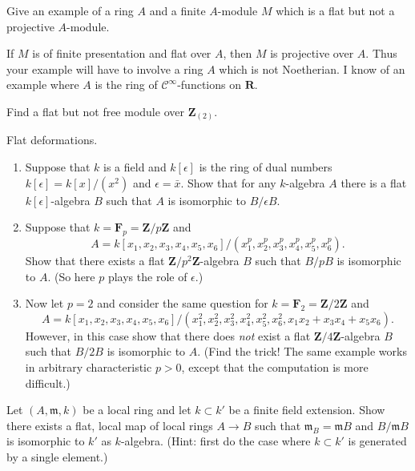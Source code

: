 \begin{exercise}
\label{exercise-flat-not-projective}
Give an example of a ring $A$ and a finite $A$-module $M$
which is a flat but not a projective $A$-module.
\end{exercise}

\begin{remark}
\label{remark-flat-not-projective}
If $M$ is of finite presentation and flat over $A$,
then $M$ is projective over $A$. Thus your example will have to
involve a ring $A$ which is not Noetherian. I know of an example
where $A$ is the ring of ${\mathcal C}^\infty$-functions on ${\mathbf R}$.
\end{remark}

\begin{exercise}
\label{exercise-flat-not-free-dvr}
Find a flat but not free module over ${\mathbf Z}_{(2)}$.
\end{exercise}

\begin{exercise}
\label{exercise-flat-deformations}
Flat deformations.
\begin{enumerate}
\item Suppose that $k$ is a field and $k[\epsilon]$ is the ring of
dual numbers $k[\epsilon] = k[x]/(x^2)$ and $\epsilon = \bar x$. Show that for
any $k$-algebra $A$ there is a flat $k[\epsilon]$-algebra $B$ such that
$A$ is isomorphic to $B/\epsilon B$.
\item Suppose that $k = {\mathbf F}_p = {\mathbf Z}/p{\mathbf Z}$ and
$$
A = k[x_1, x_2, x_3, x_4, x_5, x_6]/
(x_1^p, x_2^p, x_3^p, x_4^p, x_5^p, x_6^p).
$$
Show that there exists a flat ${\mathbf Z}/p^2{\mathbf Z}$-algebra $B$ such
that $B/pB$ is isomorphic to $A$. (So here $p$ plays the role of $\epsilon$.)
\item Now let $p = 2$ and consider the same question for
$k = {\mathbf F}_2 = {\mathbf Z}/2{\mathbf Z}$ and
$$
A = k[x_1, x_2, x_3, x_4, x_5, x_6]/
(x_1^2, x_2^2, x_3^2, x_4^2, x_5^2, x_6^2, x_1x_2 + x_3x_4 + x_5x_6).
$$
However, in this case show that there does {\it not} exist a flat
${\mathbf Z}/4{\mathbf Z}$-algebra $B$ such that $B/2B$ is isomorphic to
$A$. (Find the trick! The same example works in arbitrary characteristic
$p > 0$, except that the computation is more difficult.)
\end{enumerate}
\end{exercise}

\begin{exercise}
\label{exercise-flat-given-residue-field-extension}
Let $(A, {\mathfrak m}, k)$ be a local ring and let $k \subset k'$ be
a finite field extension. Show there exists a flat, local map of
local rings $A \to B$ such that ${\mathfrak m}_B = {\mathfrak m} B$ and
$B/{\mathfrak m} B$ is
isomorphic to $k'$ as $k$-algebra. (Hint: first do the case where
$k \subset k'$ is generated by a single element.)
\end{exercise}

